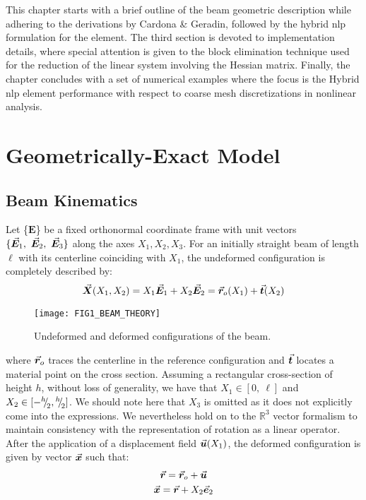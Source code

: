 This chapter starts with a brief outline of the beam geometric description 
while adhering to the derivations by Cardona \& Geradin\cite{Cardona}, followed 
by the hybrid \acrshort{nlp} formulation for the element. The third section is 
devoted to implementation details, where special attention is given to the 
block 
elimination technique used for the reduction of the linear system involving the 
Hessian matrix. Finally, the chapter concludes with a set of numerical examples 
where the focus is the Hybrid \acrshort{nlp} element performance with respect 
to coarse mesh discretizations in nonlinear analysis. 

\section{Geometrically-Exact Model}\label{section:CH2-S2}

\subsection{Beam Kinematics}\label{subsection:CH2-S2SS1}
Let \{$\mathbf{E}$\} be a fixed orthonormal coordinate frame with unit vectors
$\{\vec{\bm{E}}_1,\ \vec{\bm{E}}_2,\ \vec{\bm{E}}_3\}$ along the axes $X_1, X_2, X_3$. For
an initially straight beam of length $\ell$ with its centerline coinciding with
$X_1$, the undeformed configuration is completely described by:
\begin{gather}
	\vec{\bm{X}}(X_1,X_2) = X_1\vec{\bm{E}}_1 + X_2\vec{\bm{E}}_2 =
	\vec{\bm{r}}_o(X_1)+\vec{\bm{t}}(X_2)
\end{gather}

\begin{figure}[t]
	\centering
	\texttt{[image: FIG1\_BEAM\_THEORY]}
	\caption{Undeformed and deformed configurations of the beam.}
	\label{fig:FIG1}
\end{figure}

\noindent where $\vec{\bm{r}}_o$ traces the centerline in the reference 
configuration
and $\vec{\bm{t}}$ locates a material point on the cross section. Assuming a
rectangular cross-section of height $h$, without loss of generality, we have 
that
$X_1\in[0,\ \ell]$ and $X_2\in[-{}^h{\mskip -5mu/\mskip -3mu}_2, {}^h{\mskip -5mu/\mskip -3mu}_2]$. We should
note here that $X_3$ is omitted as it does not explicitly come into the
expressions. We nevertheless hold on to the $\mathbb{R}^3$ vector formalism to
maintain consistency with the representation of rotation as a linear operator.
After the application of a displacement field $\vec{\bm{u}}(X_1)$, the
deformed configuration is given by vector $\vec{\bm{x}}$ such that:
\begin{gather}
	\vec{\bm{r}} = \vec{\bm{r}}_o + \vec{\bm{u}} \label{eq:def1}\\
	\vec{\bm{x}}=\vec{\bm{r}} + X_2\vec{\bm{e}}_2 \label{eq:deformed}
\end{gather}

